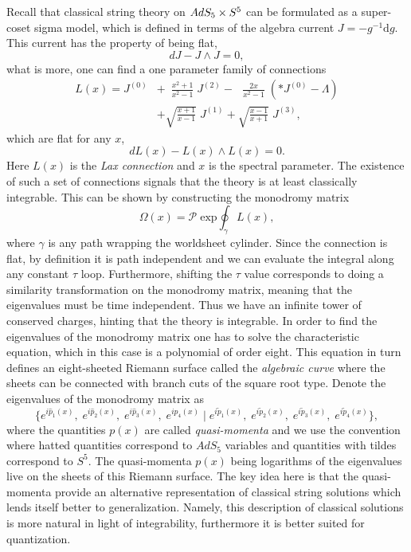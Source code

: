 Recall that classical string theory on $AdS_5 \times S^5$ can be formulated as a super-coset sigma model, which is defined in terms of the algebra current $J = -g^{-1} \mathrm{d} g$. 
This current has the property of being flat,
\begin{equation}
	dJ - J \wedge J = 0,
\end{equation}
what is more, one can find a one parameter family of connections \cite{sakura}
\begin{equation}
\begin{split}
	L(x) = J^{(0)} & + \,\,\, \frac{x^2 + 1}{x^2 - 1} \; J^{(2)}  - \,\,\,\, \frac{2x}{x^2 - 1} \; \left( * J^{(0)} - \Lambda \right) \\ 
	 & + \sqrt{\frac{x+1}{x-1}} \; J^{(1)} + \sqrt{\frac{x-1}{x+1}} \; J^{(3)},
\end{split}
\end{equation} 
which are flat for any $x$,
\begin{equation}
	dL(x) - L(x) \wedge L(x) = 0.
\end{equation}
Here $L(x)$ is the \emph{Lax connection} and $x$ is the spectral parameter. 
The existence of such a set of connections signals that the theory is at least classically integrable. 
This can be shown by constructing the monodromy matrix
\begin{equation}
	\label{eq:monodromy}
	\Omega(x) = \mathcal{P} \; \mathrm{exp} \oint_\gamma L(x),
\end{equation}
where $\gamma$ is any path wrapping the worldsheet cylinder. 
Since the connection is flat, by definition it is path independent and we can evaluate the integral along any constant $\tau$ loop. 
Furthermore, shifting the $\tau$ value corresponds to doing a similarity transformation on the monodromy matrix, meaning that the eigenvalues must be time independent. 
Thus we have an infinite tower of conserved charges, hinting that the theory is integrable. 
In order to find the eigenvalues of the monodromy matrix one has to solve the characteristic equation, which in this case is a polynomial of order eight.
This equation in turn defines an eight-sheeted Riemann surface called the \emph{algebraic curve} where the sheets can be connected with branch cuts of the square root type. 
Denote the eigenvalues of the monodromy matrix as
\begin{equation}
	\{ e^{i\hat{p}_1(x)}, \; e^{i\hat{p}_2(x)}, \; e^{i\hat{p}_3(x)}, \; e^{i\hat{p}_4(x)} \; | \; e^{i\tilde{p}_1(x)}, \; e^{i\tilde{p}_2(x)}, \; e^{i\tilde{p}_3(x)}, \; e^{i\tilde{p}_4(x)} \},
\end{equation} 
where the quantities $p(x)$ are called \emph{quasi-momenta} and we use the convention where hatted quantities correspond to $AdS_5$ variables and quantities with tildes correspond to $S^5$. 
The quasi-momenta $p(x)$ being logarithms of the eigenvalues live on the sheets of this Riemann surface.
The key idea here is that the quasi-momenta provide an alternative representation of classical string solutions which lends itself better to generalization. 
Namely, this description of classical solutions is more natural in light of integrability, furthermore it is better suited for quantization.

